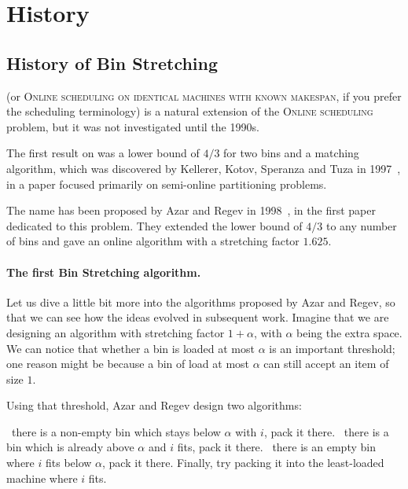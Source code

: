 \section{History}


\subsection{History of Bin Stretching}

\binstretch (or \textsc{Online scheduling on identical machines with
known makespan}, if you prefer the scheduling terminology) is a
natural extension of the \textsc{Online scheduling} problem, but it
was not investigated until the 1990s.

The first result on \binstretch was a lower bound of $4/3$ for two
bins and a matching algorithm, which was discovered by Kellerer,
Kotov, Speranza and Tuza in 1997~\cite{KeKoST97}, in a paper focused
primarily on semi-online partitioning problems.

The name \binstretch has been proposed by Azar and Regev in
1998~\cite{azar98,azar01}, in the first paper dedicated to this
problem. They extended the lower bound of $4/3$ to any number of bins
and gave an online algorithm with a stretching factor $1.625$.

\paragraph{The first Bin Stretching algorithm.} Let us dive a little
bit more into the algorithms proposed by Azar and Regev, so that we
can see how the ideas evolved in subsequent work. Imagine that we are designing
an algorithm with stretching factor $1+\alpha$, with $\alpha$ being the extra space.
We can notice that whether a bin is loaded at most $\alpha$ is an important threshold;
one reason might be because a bin of load at most $\alpha$ can still accept an item of size $1$.

Using that threshold, Azar and Regev design two algorithms:

\begin{algorithm}
\caption{}
\begin{algorithmic}[1]
\State \algorithmicif\ there is a non-empty bin which stays below $\alpha$ with $i$, pack it there.
\State \algorithmicif\ there is a bin which is already above $\alpha$ and $i$ fits, pack it there.
\State \algorithmicif\ there is an empty bin where $i$ fits below $\alpha$, pack it there.
\State Finally, try packing it into the least-loaded machine where $i$ fits.
\EndFor 
\end{algorithmic}
\end{algorithm}

